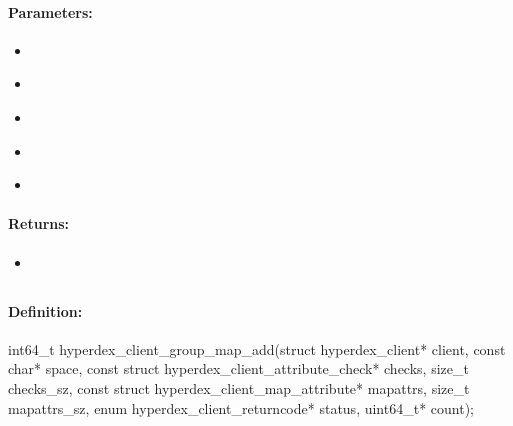 \paragraph{Parameters:}
\begin{itemize}[noitemsep]
\item {}\\

\item {}\\

\item {}\\

\item {}\\

\item {}\\

\end{itemize}

\paragraph{Returns:}
\begin{itemize}[noitemsep]
\item {}\\

\end{itemize}

\pagebreak
\subsection{}
\label{api:c:group_map_add}


\paragraph{Definition:}
\begin{ccode}
int64_t hyperdex_client_group_map_add(struct hyperdex_client* client,
        const char* space,
        const struct hyperdex_client_attribute_check* checks, size_t checks_sz,
        const struct hyperdex_client_map_attribute* mapattrs, size_t mapattrs_sz,
        enum hyperdex_client_returncode* status,
        uint64_t* count);
\end{ccode}

